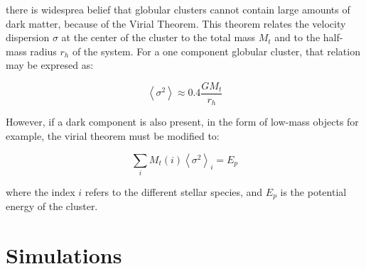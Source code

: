 there is  widesprea belief that globular clusters cannot contain large amounts of dark matter, because of the Virial Theorem. This theorem relates the velocity dispersion $ \sigma $ at the center of the cluster to the total mass $M_{t}$ and to the half-mass radius $r_{h}$ of the system. For a one component globular cluster, that relation may be expresed as:

\begin{equation}
\left\langle \sigma^{2}\right\rangle \approx0.4\frac{GM_{t}}{r_{h}}
\end{equation}

However, if a dark component is also present, in the form of low-mass objects for example, the virial theorem must be modified to:

\begin{equation}
\sum_{i}M_{t}(i)\left\langle \sigma^{2}\right\rangle _{i}=E_{p}
\end{equation}

where the index $i$ refers to the different stellar species, and $E_{p}$ is the potential energy of the cluster.

\section{Simulations}
